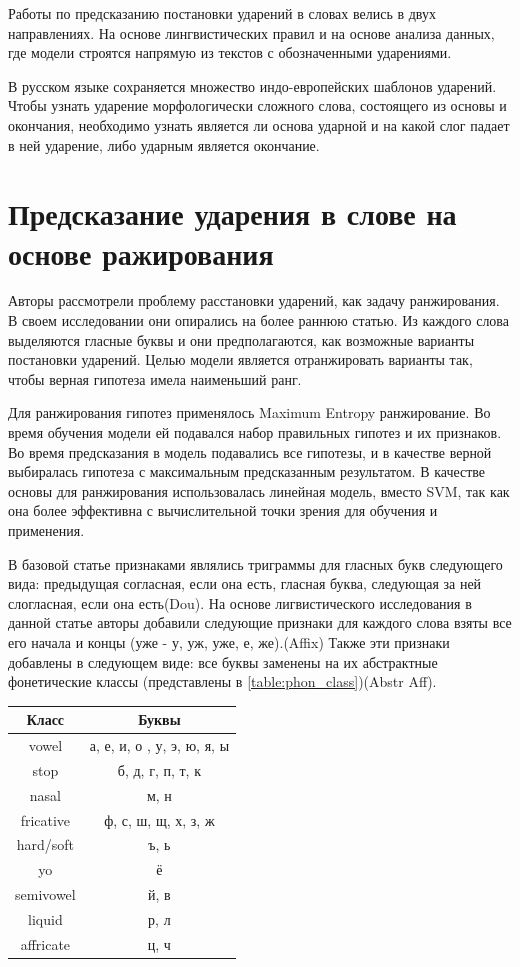 \documentclass[14pt, a4paper, russian]{report}
\begin{document}
\begin{normalsize}
Работы по предсказанию постановки ударений в словах велись в двух направлениях. На основе лингвистических правил \cite{church, williams} и на основе анализа данных, где модели строятся напрямую из текстов с обозначенными ударениями. 

В русском языке сохраняется множество индо-европейских шаблонов ударений. Чтобы узнать ударение морфологически сложного слова, состоящего из основы и окончания, необходимо узнать является ли основа ударной и на какой слог падает в ней ударение, либо ударным является окончание. \cite{halle}
\section{Предсказание ударения в слове на основе ражирования}
Авторы\cite{hall} рассмотрели проблему расстановки ударений, как задачу ранжирования. В своем исследовании  они опирались на более раннюю статью\cite{dou}. Из каждого слова выделяются гласные буквы и они предполагаются, как возможные варианты постановки ударений. Целью модели является отранжировать варианты так, чтобы верная гипотеза имела наименьший ранг.

Для ранжирования гипотез применялось Maximum Entropy ранжирование.\cite{collins} Во время обучения модели ей подавался набор правильных гипотез и их признаков. Во время предсказания в модель подавались все гипотезы, и в качестве верной выбиралась гипотеза с максимальным предсказанным результатом. В качестве основы для ранжирования использовалась линейная модель, вместо SVM, так как она более эффективна с вычислительной точки зрения для обучения и применения. 

В базовой статье\cite{dou} признаками являлись триграммы для гласных букв следующего вида: предыдущая согласная, если она есть, гласная буква, следующая за ней слогласная, если она есть(Dou). На основе лигвистического исследования в данной статье авторы добавили следующие признаки для каждого слова взяты все его начала и концы (уже - у, уж, уже, е, же).(Affix) Также эти признаки добавлены в следующем виде: все буквы заменены на их абстрактные фонетические классы (представлены в \cref{table:phon_class})({Abstr Aff}).
\begin{table}[H]
	\begin{small}
		\begin{center}
			\begin{tabular}{|c|c|}
				\hline
				Класс & Буквы \\			
				\hline
				vowel & а, е, и, о , у, э, ю, я, ы \\
				\hline
				stop & б, д, г, п, т, к \\
				\hline
				nasal & м, н \\
				\hline
				fricative & ф, с, ш, щ, х, з, ж \\
\hline
				hard/soft & ъ, ь\\
\hline
				yo & ё \\
\hline
				semivowel & й, в \\
\hline
				liquid & р, л\\
\hline
				affricate & ц, ч \\
\hline
		

\end{tabular}
\end{center}
\end{small}
\end{table}
\end{normalsize}
\end{document}
